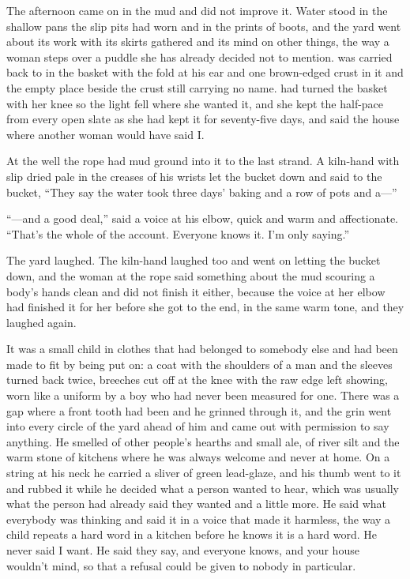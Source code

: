The afternoon came on in the mud and did not improve it. Water stood in the shallow pans the slip pits had worn and in the prints of boots, and the yard went about its work with its skirts gathered and its mind on other things, the way a woman steps over a puddle she has already decided not to mention.  was carried back to  in the basket with the fold at his ear and one brown-edged crust in it and the empty place beside the crust still carrying no name.  had turned the basket with her knee so the light fell where she wanted it, and she kept the half-pace from every open slate as she had kept it for seventy-five days, and said the house where another woman would have said I.

At the well the rope had mud ground into it to the last strand. A kiln-hand with slip dried pale in the creases of his wrists let the bucket down and said to the bucket, “They say the water took three days' baking and a row of pots and a—”

“—and a good deal,” said a voice at his elbow, quick and warm and affectionate. “That's the whole of the account. Everyone knows it. I'm only saying.”

The yard laughed. The kiln-hand laughed too and went on letting the bucket down, and the woman at the rope said something about the mud scouring a body's hands clean and did not finish it either, because the voice at her elbow had finished it for her before she got to the end, in the same warm tone, and they laughed again.

It was a small child in clothes that had belonged to somebody else and had been made to fit by being put on: a coat with the shoulders of a man and the sleeves turned back twice, breeches cut off at the knee with the raw edge left showing, worn like a uniform by a boy who had never been measured for one. There was a gap where a front tooth had been and he grinned through it, and the grin went into every circle of the yard ahead of him and came out with permission to say anything. He smelled of other people's hearths and small ale, of river silt and the warm stone of kitchens where he was always welcome and never at home. On a string at his neck he carried a sliver of green lead-glaze, and his thumb went to it and rubbed it while he decided what a person wanted to hear, which was usually what the person had already said they wanted and a little more. He said what everybody was thinking and said it in a voice that made it harmless, the way a child repeats a hard word in a kitchen before he knows it is a hard word. He never said I want. He said they say, and everyone knows, and your house wouldn't mind, so that a refusal could be given to nobody in particular.

